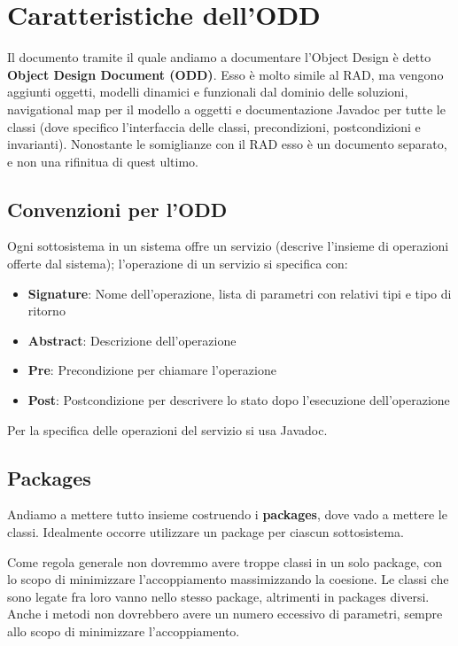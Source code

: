     \section{Caratteristiche dell'ODD}
        Il documento tramite il quale andiamo a documentare l'Object Design è detto \textbf{Object Design Document (ODD)}. Esso è molto simile al RAD, ma vengono aggiunti oggetti, modelli dinamici e funzionali dal dominio delle soluzioni, navigational map per il modello a oggetti e documentazione Javadoc per tutte le classi (dove specifico l'interfaccia delle classi, precondizioni, postcondizioni e invarianti). Nonostante le somiglianze con il RAD esso è un documento separato, e non una rifinitua di quest ultimo.
        
        \subsection{Convenzioni per l'ODD}
            Ogni sottosistema in un sistema offre un servizio (descrive l'insieme di operazioni offerte dal sistema); l'operazione di un servizio si specifica con:
            \begin{itemize}
                \item \textbf{Signature}: Nome dell'operazione, lista di parametri con relativi tipi e tipo di ritorno
                \item \textbf{Abstract}: Descrizione dell'operazione
                \item \textbf{Pre}: Precondizione per chiamare l'operazione
                \item \textbf{Post}: Postcondizione per descrivere lo stato dopo l'esecuzione dell'operazione
            \end{itemize}
            Per la specifica delle operazioni del servizio si usa Javadoc.
            
        \subsection{Packages}
            Andiamo a mettere tutto insieme costruendo i \textbf{packages}, dove vado a mettere le classi. Idealmente occorre utilizzare un package per ciascun sottosistema.
            
            Come regola generale non dovremmo avere troppe classi in un solo package, con lo scopo di minimizzare l'accoppiamento massimizzando la coesione. Le classi che sono legate fra loro vanno nello stesso package, altrimenti in packages diversi. Anche i metodi non dovrebbero avere un numero eccessivo di parametri, sempre allo scopo di minimizzare l'accoppiamento.
            
